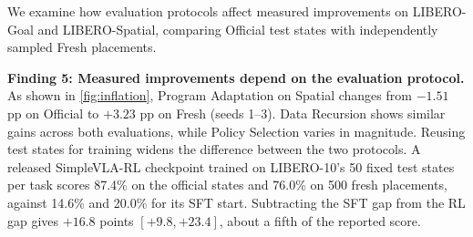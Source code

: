 We examine how evaluation protocols affect measured improvements on LIBERO-Goal and LIBERO-Spatial, comparing Official test states with independently sampled Fresh placements.

\indent\textbf{Finding 5: Measured improvements depend on the evaluation protocol.} As shown in \cref{fig:inflation}, Program Adaptation on Spatial changes from $-1.51$ pp on Official to $+3.23$ pp on Fresh (seeds 1--3). Data Recursion shows similar gains across both evaluations, while Policy Selection varies in magnitude. Reusing test states for training widens the difference between the two protocols. A released SimpleVLA-RL checkpoint trained on LIBERO-10's 50 fixed test states per task scores 87.4\% on the official states and 76.0\% on 500 fresh placements, against 14.6\% and 20.0\% for its SFT start. Subtracting the SFT gap from the RL gap gives $+16.8$ points $[+9.8, +23.4]$, about a fifth of the reported score.